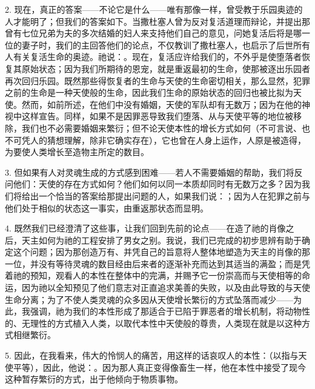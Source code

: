 2. 现在，真正的答案——不论它是什么——唯有那像一样，曾受教于乐园奥迹的人才能明了；但我们的答案如下。当撒杜塞人曾为反对复活道理而辩论，并提出那曾有七位兄弟为夫的多次结婚的妇人来支持他们自己的意见，问她复活后将是哪一位的妻子时，我们的主回答他们的论点，不仅教训了撒杜塞人，也启示了后世所有人有关复活生命的奥迹。祂说：。现在，复活应许给我们的，不外乎是使堕落者恢复其原始状态；因为我们所期待的恩宠，就是重返最初的生命，使那被逐出乐园者再次回归乐园。既然那些得恢复者的生命与天使的生命密切相关，那么显然，犯罪之前的生命是一种天使般的生命，因此我们生命的原始状态的回归也被比拟为天使。然而，如前所述，在他们中没有婚姻，天使的军队却有无数万；因为在他的神视中这样宣告。同样，如果不是因罪恶导致我们堕落、从与天使平等的地位被移除，我们也不必需要婚姻来繁衍；但不论天使本性的增长方式如何（不可言说、也不可凭人的猜想理解，除非它确实存在），它也曾在人身上运作，人原是被造得，为要使人类增长至造物主所定的数目。\par

3. 但如果有人对灵魂生成的方式感到困难——若人不需要婚姻的帮助，我们将反问他们：天使的存在方式如何？他们如何以同一本质却同时有无数万之多？因为我们将给出一个恰当的答案给那提出问题的人，如果我们说：；因为人在犯罪之前与他们处于相似的状态这一事实，由重返那状态而显明。\par

4. 既然我们已经澄清了这些事，让我们回到先前的论点——在造了祂的肖像之后，天主如何为祂的工程安排了男女之别。我说，我们已完成的初步思辨有助于确定这个问题；因为那创造万有、并凭自己的旨意将人整体地塑造为天主的肖像的那一位，并没有等待灵魂的数目经由后来者的逐渐补充而达到其适当的满盈；而是凭着祂的预知，观看人的本性在整体中的完满，并赐予它一份崇高而与天使相等的命运，因为祂以全知预见了他们意志对正直追求美善的失败，以及由此导致的与天使生命分离；为了不使人类灵魂的众多因从天使增长繁衍的方式坠落而减少——为此，我强调，祂为我们的本性形成了那适合于已陷于罪恶者的增长机制，将动物性的、无理性的方式植入人类，以取代本性中天使般的尊贵，人类现在就是以这种方式相继繁衍。\par

5. 因此，在我看来，伟大的怜悯人的痛苦，用这样的话哀叹人的本性：（以指与天使平等），因此，他说：。因为那人真正变得像畜生一样，他在本性中接受了现今这种暂存繁衍的方式，出于他倾向于物质事物。\par

